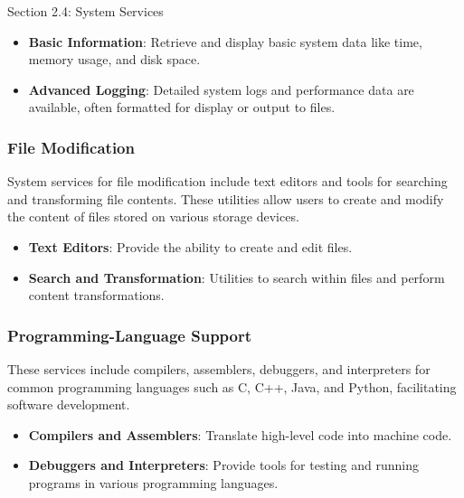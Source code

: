 \begin{notes}{Section 2.4: System Services}
\begin{highlight}
    \begin{itemize}
        \item \textbf{Basic Information}: Retrieve and display basic system data like time, memory usage, and disk space.
        \item \textbf{Advanced Logging}: Detailed system logs and performance data are available, often formatted for display or output to files.
    \end{itemize}
    
    \end{highlight}
    
    \subsubsection*{File Modification}
    
    System services for file modification include text editors and tools for searching and transforming file contents. These utilities allow users to create and modify the content of files stored 
    on various storage devices.
    
    \begin{highlight}
    
    \begin{itemize}
        \item \textbf{Text Editors}: Provide the ability to create and edit files.
        \item \textbf{Search and Transformation}: Utilities to search within files and perform content transformations.
    \end{itemize}
    
    \end{highlight}
    
    \subsubsection*{Programming-Language Support}
    
    These services include compilers, assemblers, debuggers, and interpreters for common programming languages such as C, C++, Java, and Python, facilitating software development.
    
    \begin{highlight}
    
    \begin{itemize}
        \item \textbf{Compilers and Assemblers}: Translate high-level code into machine code.
        \item \textbf{Debuggers and Interpreters}: Provide tools for testing and running programs in various programming languages.
    \end{itemize}
    

\end{highlight}
\end{notes}
